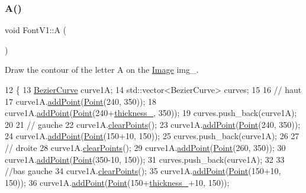 \subsubsection{\texorpdfstring{A()}{A()}}
{\footnotesize\ttfamily void Font\+V1\+::A (\begin{DoxyParamCaption}{ }\end{DoxyParamCaption})}



Draw the contour of the letter A on the \mbox{\hyperlink{class_image}{Image}} img\+\_\+. 


\begin{DoxyCode}
12               \{
13     \mbox{\hyperlink{class_bezier_curve}{BezierCurve}} curve1A;
14     std::vector<BezierCurve> curves;
15 
16     \textcolor{comment}{// haut}
17     curve1A.\mbox{\hyperlink{class_bezier_curve_a38d16c18b36ae45619b05e26e226cf34}{addPoint}}(\mbox{\hyperlink{class_point}{Point}}(240, 350));
18     curve1A.\mbox{\hyperlink{class_bezier_curve_a38d16c18b36ae45619b05e26e226cf34}{addPoint}}(\mbox{\hyperlink{class_point}{Point}}(240+\mbox{\hyperlink{class_font_v1_aed8040e76be9a52833627b92f0fb4e5f}{thickness\_}}, 350));
19     curves.push\_back(curve1A);
20 
21     \textcolor{comment}{// gauche}
22     curve1A.\mbox{\hyperlink{class_bezier_curve_a0ba8ce66d5af5971ae6a1b506029728e}{clearPoints}}();
23     curve1A.\mbox{\hyperlink{class_bezier_curve_a38d16c18b36ae45619b05e26e226cf34}{addPoint}}(\mbox{\hyperlink{class_point}{Point}}(240, 350));
24     curve1A.\mbox{\hyperlink{class_bezier_curve_a38d16c18b36ae45619b05e26e226cf34}{addPoint}}(\mbox{\hyperlink{class_point}{Point}}(150+10, 150));
25     curves.push\_back(curve1A);
26 
27     \textcolor{comment}{// droite}
28     curve1A.\mbox{\hyperlink{class_bezier_curve_a0ba8ce66d5af5971ae6a1b506029728e}{clearPoints}}();
29     curve1A.\mbox{\hyperlink{class_bezier_curve_a38d16c18b36ae45619b05e26e226cf34}{addPoint}}(\mbox{\hyperlink{class_point}{Point}}(260, 350));
30     curve1A.\mbox{\hyperlink{class_bezier_curve_a38d16c18b36ae45619b05e26e226cf34}{addPoint}}(\mbox{\hyperlink{class_point}{Point}}(350-10, 150));
31     curves.push\_back(curve1A);
32 
33     \textcolor{comment}{//bas gauche}
34     curve1A.\mbox{\hyperlink{class_bezier_curve_a0ba8ce66d5af5971ae6a1b506029728e}{clearPoints}}();
35     curve1A.\mbox{\hyperlink{class_bezier_curve_a38d16c18b36ae45619b05e26e226cf34}{addPoint}}(\mbox{\hyperlink{class_point}{Point}}(150+10, 150));
36     curve1A.\mbox{\hyperlink{class_bezier_curve_a38d16c18b36ae45619b05e26e226cf34}{addPoint}}(\mbox{\hyperlink{class_point}{Point}}(150+\mbox{\hyperlink{class_font_v1_aed8040e76be9a52833627b92f0fb4e5f}{thickness\_}}+10, 150));

\end{DoxyCode}
